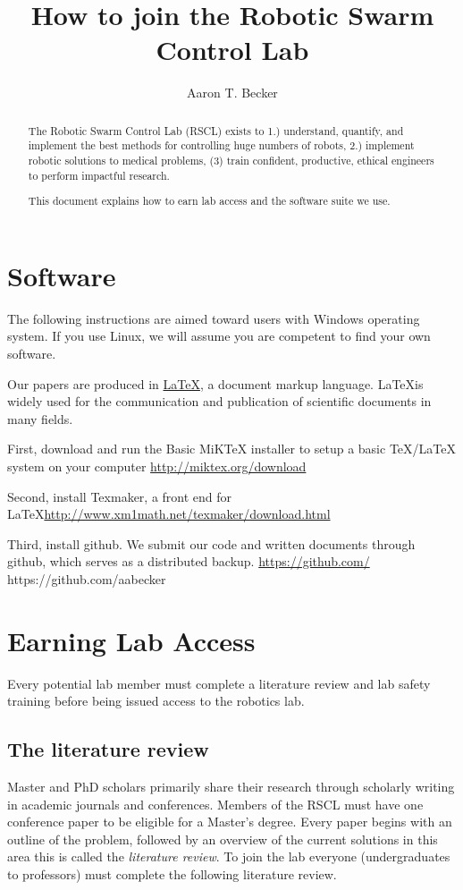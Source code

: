 \documentclass[letterpaper, 10 pt, conference]{ieeeconf}
\begin{document}
\author{Aaron T. Becker}
\title{How to join the Robotic Swarm Control Lab}
\maketitle

\begin{abstract}
The Robotic Swarm Control Lab (RSCL) exists to 1.) understand, quantify, and implement the best methods for controlling huge numbers of robots, 2.)  implement robotic solutions to medical problems, (3)  train confident, productive, ethical engineers to perform impactful research.

This document explains how to earn lab access and the software suite we use.
\end{abstract}



\section{Software}
The following instructions are aimed toward users with Windows operating system. If you use Linux, we will assume you are competent to find your own software.

Our papers are produced in \href{http://en.wikipedia.org/wiki/LaTeX}{\LaTeX}, a document markup language. \LaTeX is widely used for the communication and publication of scientific documents in many fields.

First, download and run the Basic MiKTeX installer to setup a basic TeX/LaTeX system on your computer \url{http://miktex.org/download}

Second, install Texmaker, a front end for \LaTeX \url{http://www.xm1math.net/texmaker/download.html}

Third, install github. We submit our code and written documents through github, which serves as a distributed backup. 
\url{https://github.com/}
https://github.com/aabecker





 
\section{Earning Lab Access}
Every potential lab member must complete a literature review and lab safety training before being issued access to the robotics lab.

\subsection{The literature review}
Master and PhD scholars primarily share their research through scholarly writing in academic journals and conferences. Members of the RSCL must have one conference paper to be eligible for a Master's degree. Every paper begins with an outline of the problem, followed by an overview of the current solutions in this area this is called the \emph{literature review}. To join the lab everyone (undergraduates to professors) must complete the following literature review.
\end{document}
